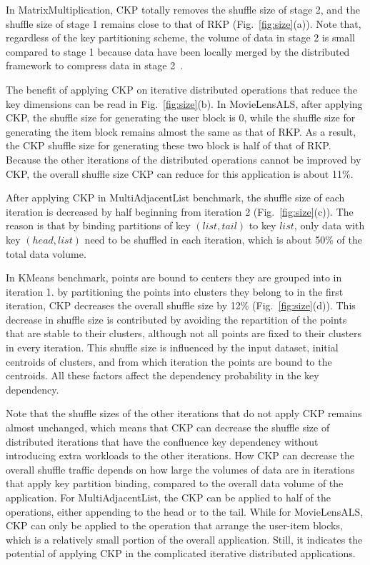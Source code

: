 \documentclass[10pt,journal,compsoc]{IEEEtran}
\begin{document}
In MatrixMultiplication, CKP totally removes the shuffle size of stage 2, and the shuffle size of stage 1 remains close to that of RKP (Fig.~\ref{fig:size}(a)). 
Note that, regardless of the key partitioning scheme, the volume of data in stage 2 is small compared to stage 1 because data have been locally merged by the distributed framework to compress data in stage 2~\cite{zaharia2012resilient}.

The benefit of applying CKP on iterative distributed operations 
that reduce the key dimensions can be read in Fig.~\ref{fig:size}(b).
In MovieLensALS, after applying CKP, the shuffle size for generating the user block is 0, while the shuffle size for generating the item block remains almost the same as that of RKP. 
As a result, the CKP shuffle size for generating these two block is half of that of RKP. 
Because the other iterations of the distributed operations cannot be improved by CKP, 
the overall shuffle size CKP can reduce for this application is about 11\%.

After applying CKP in MultiAdjacentList benchmark, the shuffle size of each iteration is decreased by half beginning from iteration 2 (Fig.~\ref{fig:size}(c)). 
The reason is that by binding partitions of key $(list, tail)$ 
to key $list$, only data with key $(head, list)$ need to be shuffled in each iteration, which is about 50\% of the total data volume. 

In KMeans benchmark, points are bound to centers they are grouped into in iteration 1. by partitioning the points into clusters they belong to in the first iteration, CKP decreases the overall shuffle size by 12\% (Fig.~\ref{fig:size}(d)). 
This decrease in shuffle size is contributed by avoiding the repartition of the points that are stable to their clusters,
although not all points are fixed to their clusters in every iteration. 
This shuffle size is influenced by the input dataset, initial 
centroids of clusters, and from which iteration the points are bound to the centroids.
All these factors affect the dependency probability in the key dependency.

Note that the shuffle sizes of the other iterations that do not apply CKP remains almost unchanged, which means that CKP can decrease the shuffle size of distributed iterations that have the confluence key dependency without introducing extra workloads to the other iterations. 
How CKP can decrease the overall shuffle traffic depends on how large the volumes of data are in iterations that apply key partition binding, compared to the overall data volume of the application. 
For MultiAdjacentList, the CKP can be applied to half of the operations, either appending to the head or to the tail.
While for MovieLensALS, CKP can only be applied to the operation that arrange the user-item blocks, which is a relatively small portion of the overall application. 
Still, it indicates the potential of applying CKP in the complicated iterative distributed applications. 
\end{document}
